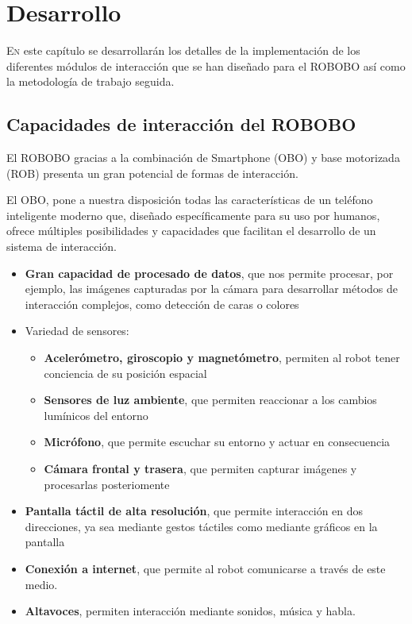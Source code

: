 
\chapter{Desarrollo}
\label{chap:desarrollo}
\vspace{0.5cm}

\lettrine{E}{n} este capítulo se desarrollarán los detalles de la implementación de los diferentes módulos de interacción que se han diseñado para el ROBOBO así como la metodología de trabajo seguida.
\section{Capacidades de interacción del ROBOBO}
\label{sec:capacidades-interactivas}

El ROBOBO gracias a la combinación de Smartphone (OBO) y base motorizada (ROB) presenta un gran potencial de formas de interacción.

El OBO, pone a nuestra disposición todas las características de un teléfono inteligente moderno que, diseñado específicamente para su uso por humanos, ofrece múltiples posibilidades y capacidades que facilitan el desarrollo de un sistema de interacción.
\begin{itemize}
	\item \textbf{Gran capacidad de procesado de datos}, que nos permite procesar, por ejemplo, las imágenes capturadas por la cámara para desarrollar métodos de interacción complejos, como detección de caras o colores
	\item Variedad de sensores:
	\begin{itemize}
		\item \textbf{Acelerómetro, giroscopio y magnetómetro}, permiten al robot tener conciencia de su posición espacial
		\item \textbf{Sensores de luz ambiente}, que permiten reaccionar a los cambios lumínicos del entorno
		\item \textbf{Micrófono}, que permite escuchar su entorno y actuar en consecuencia
		\item \textbf{Cámara frontal y trasera}, que permiten capturar imágenes y procesarlas posteriomente
	\end{itemize}
	\item \textbf{Pantalla táctil de alta resolución}, que permite interacción en dos direcciones, ya sea mediante gestos táctiles como mediante gráficos en la pantalla
	\item \textbf{Conexión a internet}, que permite al robot comunicarse a través de este medio.
	\item \textbf{Altavoces}, permiten interacción mediante sonidos, música y habla.
\end{itemize}

